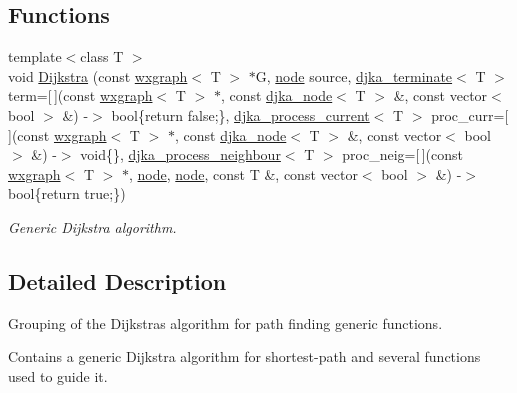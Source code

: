 \subsection*{Functions}
\begin{DoxyCompactItemize}
\item 
{\footnotesize template$<$class T $>$ }\\void \hyperlink{namespacelgraph_1_1traversal_1_1dijkstra_acb68be0fd5a51010ba509150bc9c8c90}{Dijkstra} (const \hyperlink{classlgraph_1_1utils_1_1wxgraph}{wxgraph}$<$ T $>$ $\ast$G, \hyperlink{namespacelgraph_1_1utils_ab9c6b34241f0b68372c55f34c460e863}{node} source, \hyperlink{namespacelgraph_1_1traversal_1_1dijkstra_a275e9ff05e4d3199245b9642cc88fc74}{djka\+\_\+terminate}$<$ T $>$ term=\mbox{[}$\,$\mbox{]}(const \hyperlink{classlgraph_1_1utils_1_1wxgraph}{wxgraph}$<$ T $>$ $\ast$, const \hyperlink{namespacelgraph_1_1traversal_1_1dijkstra_a06495bda19735564a02a6e98198a0980}{djka\+\_\+node}$<$ T $>$ \&, const vector$<$ bool $>$ \&) -\/$>$ bool\{return false;\}, \hyperlink{namespacelgraph_1_1traversal_1_1dijkstra_a1b15b8b987d2eea35dd01676ba1d3b35}{djka\+\_\+process\+\_\+current}$<$ T $>$ proc\+\_\+curr=\mbox{[}$\,$\mbox{]}(const \hyperlink{classlgraph_1_1utils_1_1wxgraph}{wxgraph}$<$ T $>$ $\ast$, const \hyperlink{namespacelgraph_1_1traversal_1_1dijkstra_a06495bda19735564a02a6e98198a0980}{djka\+\_\+node}$<$ T $>$ \&, const vector$<$ bool $>$ \&) -\/$>$ void\{\}, \hyperlink{namespacelgraph_1_1traversal_1_1dijkstra_abd266610f7bab0d52a202238ca539d38}{djka\+\_\+process\+\_\+neighbour}$<$ T $>$ proc\+\_\+neig=\mbox{[}$\,$\mbox{]}(const \hyperlink{classlgraph_1_1utils_1_1wxgraph}{wxgraph}$<$ T $>$ $\ast$, \hyperlink{namespacelgraph_1_1utils_ab9c6b34241f0b68372c55f34c460e863}{node}, \hyperlink{namespacelgraph_1_1utils_ab9c6b34241f0b68372c55f34c460e863}{node}, const T \&, const vector$<$ bool $>$ \&) -\/$>$ bool\{return true;\})
\begin{DoxyCompactList}\small\item\em Generic Dijkstra algorithm. \end{DoxyCompactList}\end{DoxyCompactItemize}


\subsection{Detailed Description}
Grouping of the Dijkstra\textquotesingle{}s algorithm for path finding generic functions. 

Contains a generic Dijkstra algorithm for shortest-\/path and several functions used to guide it. 

